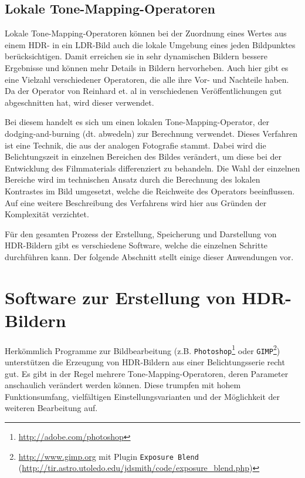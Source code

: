 \subsection{Lokale \gls{Tone-Mapping}-Operatoren}
\label{sub:tone:local}

Lokale \gls{Tone-Mapping}-Operatoren können bei der Zuordnung eines Wertes aus einem \gls{HDR}- in ein \gls{LDR}-Bild auch die lokale Umgebung eines jeden Bildpunktes berücksichtigen. Damit erreichen sie in sehr dynamischen Bildern bessere Ergebnisse und können mehr Details in Bildern hervorheben. Auch hier gibt es eine Vielzahl verschiedener Operatoren, die alle ihre Vor- und Nachteile haben. Da der Operator von Reinhard et. al \cite{ReinhardToneMapper} in verschiedenen Veröffentlichungen \cite{tone_mapper_1,tone_mapper_2} gut abgeschnitten hat, wird dieser verwendet.

Bei diesem handelt es sich um einen lokalen \gls{Tone-Mapping}-Operator, der dodging-and-burning (dt. abwedeln) zur Berechnung verwendet. Dieses Verfahren ist eine Technik, die aus der analogen Fotografie stammt. Dabei wird die Belichtungszeit in einzelnen Bereichen des Bildes verändert, um diese bei der Entwicklung des Filmmaterials differenziert zu behandeln. Die Wahl der einzelnen Bereiche wird im technischen Ansatz durch die Berechnung des lokalen Kontrastes im Bild umgesetzt, welche die Reichweite des Operators beeinflussen. Auf eine weitere Beschreibung des Verfahrens wird hier aus Gründen der Komplexität verzichtet.

Für den gesamten Prozess der Erstellung, Speicherung und Darstellung von \gls{HDR}-Bildern gibt es verschiedene Software, welche die einzelnen Schritte durchführen kann. Der folgende Abschnitt stellt einige dieser Anwendungen vor.
\section{Software zur Erstellung von HDR-Bildern}
\label{sec:software}
Herkömmlich Programme zur Bildbearbeitung (z.B. \texttt{Photoshop}\footnote{\url{http://adobe.com/photoshop}} oder \texttt{GIMP}\footnote{\url{http://www.gimp.org} mit Plugin \texttt{Exposure Blend} (\url{http://tir.astro.utoledo.edu/jdsmith/code/exposure_blend.php})}) unterstützen die Erzeugung von \gls{HDR}-Bildern aus einer Belichtungsserie recht gut. Es gibt in der Regel mehrere \gls{Tone-Mapping}-Operatoren, deren Parameter anschaulich verändert werden können. Diese trumpfen mit hohem Funktionsumfang, vielfältigen Einstellungsvarianten und der Möglichkeit der weiteren Bearbeitung auf.


